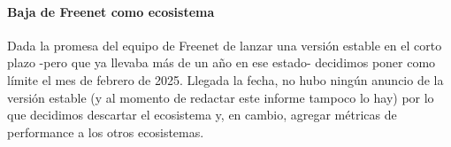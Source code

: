 \paragraph{Baja de Freenet como ecosistema}
Dada la promesa del equipo de Freenet de lanzar una versión estable en el corto plazo -pero que ya llevaba más de un año en ese estado- decidimos poner como límite el mes de febrero de 2025. Llegada la fecha, no hubo ningún anuncio de la versión estable (y al momento de redactar este informe tampoco lo hay) por lo que decidimos descartar el ecosistema y, en cambio, agregar métricas de performance a los otros ecosistemas.